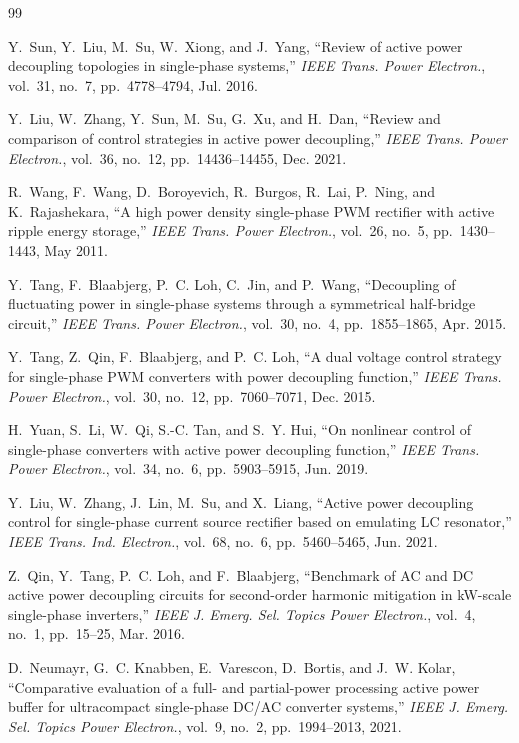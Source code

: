 \documentclass[11pt,a4paper]{article}
\begin{document}
\begin{thebibliography}{99}

Y.~Sun, Y.~Liu, M.~Su, W.~Xiong, and J.~Yang, ``Review of active power
decoupling topologies in single-phase systems,'' \emph{IEEE Trans. Power
Electron.}, vol.~31, no.~7, pp.~4778--4794, Jul. 2016.

Y.~Liu, W.~Zhang, Y.~Sun, M.~Su, G.~Xu, and H.~Dan, ``Review and comparison of
control strategies in active power decoupling,'' \emph{IEEE Trans. Power
Electron.}, vol.~36, no.~12, pp.~14436--14455, Dec. 2021.

R.~Wang, F.~Wang, D.~Boroyevich, R.~Burgos, R.~Lai, P.~Ning, and
K.~Rajashekara, ``A high power density single-phase PWM rectifier with active
ripple energy storage,'' \emph{IEEE Trans. Power Electron.}, vol.~26, no.~5,
pp.~1430--1443, May 2011.

Y.~Tang, F.~Blaabjerg, P.~C. Loh, C.~Jin, and P.~Wang, ``Decoupling of
fluctuating power in single-phase systems through a symmetrical half-bridge
circuit,'' \emph{IEEE Trans. Power Electron.}, vol.~30, no.~4, pp.~1855--1865,
Apr. 2015.

Y.~Tang, Z.~Qin, F.~Blaabjerg, and P.~C. Loh, ``A dual voltage control strategy
for single-phase PWM converters with power decoupling function,'' \emph{IEEE
Trans. Power Electron.}, vol.~30, no.~12, pp.~7060--7071, Dec. 2015.

H.~Yuan, S.~Li, W.~Qi, S.-C. Tan, and S.~Y. Hui, ``On nonlinear control of
single-phase converters with active power decoupling function,'' \emph{IEEE
Trans. Power Electron.}, vol.~34, no.~6, pp.~5903--5915, Jun. 2019.

Y.~Liu, W.~Zhang, J.~Lin, M.~Su, and X.~Liang, ``Active power decoupling control
for single-phase current source rectifier based on emulating LC resonator,''
\emph{IEEE Trans. Ind. Electron.}, vol.~68, no.~6, pp.~5460--5465, Jun. 2021.

Z.~Qin, Y.~Tang, P.~C. Loh, and F.~Blaabjerg, ``Benchmark of AC and DC active
power decoupling circuits for second-order harmonic mitigation in kW-scale
single-phase inverters,'' \emph{IEEE J. Emerg. Sel. Topics Power Electron.},
vol.~4, no.~1, pp.~15--25, Mar. 2016.

D.~Neumayr, G.~C. Knabben, E.~Varescon, D.~Bortis, and J.~W. Kolar,
``Comparative evaluation of a full- and partial-power processing active power
buffer for ultracompact single-phase DC/AC converter systems,'' \emph{IEEE J.
Emerg. Sel. Topics Power Electron.}, vol.~9, no.~2, pp.~1994--2013, 2021.


\end{thebibliography}
\end{document}
